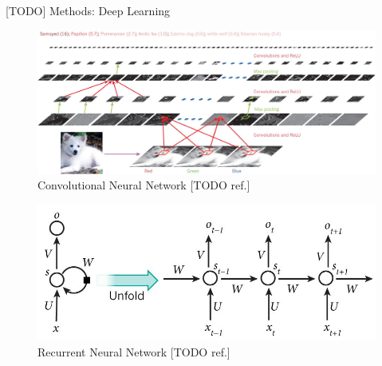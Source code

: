 \documentclass[final,hyperref={pdfpagelabels=false}]{beamer}
\begin{document}
\begin{frame}[t]
\begin{columns}[t]
\begin{column}{.465\textwidth}
\begin{block}{[TODO] Methods: Deep Learning}
\begin{figure}
\includegraphics[width=.9\linewidth]{nature-deep-learning/fig_2}
\caption{Convolutional Neural Network [TODO ref.]}
\end{figure}

\begin{figure}
\includegraphics[width=.6\linewidth]{nature-deep-learning/fig_5}
\caption{Recurrent Neural Network [TODO ref.]}
\end{figure}


\end{block}
\end{column}
\end{columns}
\end{frame}
\end{document}
